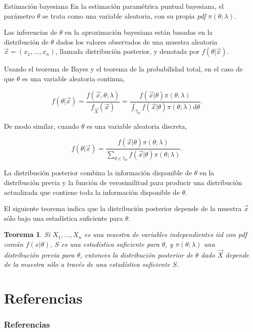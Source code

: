 \documentclass{beamer}
\newtheorem{theo}{Teorema}[section]
\begin{document}
	\begin{frame}[allowframebreaks]{Estimación bayesiana}
		En la estimación paramétrica puntual bayesiana, el parámetro $\theta$ se trata como una variable aleatoria, con su propia \textit{pdf} $\pi(\theta;\lambda)$.
		
		Las inferencias de $\theta$ en la aproximación bayesiana están basadas en la distribución de $\theta$ dados los valores observados de una muestra aleatoria $\vec{x}=(x_1,\dots,x_n)$, llamada distribución posterior, y denotada por $f(\theta | \vec{x})$.
		
		Usando el teorema de Bayes y el teorema de la probabilidad total, en el caso de que $\theta$ es una variable aleatoria continua,
		
		$$f(\theta | \vec{x})=\frac{f(\vec{x},\theta;\lambda)}{f_{\vec{X}}(\vec{x})}=\frac{f(\vec{x}|\theta)\pi(\theta;\lambda)}{\int_{\mathbb{S}_\theta}f(\vec{x}|\theta)\pi(\theta;\lambda)\mathrm{d}\theta}.$$
		
		De modo similar, cuando $\theta$ es una variable aleatoria discreta,
		
		$$f(\theta|\vec{x})=\frac{f(\vec{x}|\theta)\pi(\theta;\lambda)}{\sum_{\theta\in\mathbb{S}_\theta}f(\vec{x}|\theta)\pi(\theta;\lambda)}.$$
		
		La distribución posterior combina la información disponible de $\theta$ en la distribución previa y la función de verosimilitud para producir una distribución actualizada que contiene toda la información disponible de $\theta$.
		
El siguiente teorema indica que la distribución posterior depende de la muestra $\vec{x}$ sólo bajo una estadística suficiente para $\theta$.
		
		\begin{theo}
			Si $X_1,\dots,X_n$ es una muestra de variables independientes iid con pdf común $f(x|\theta)$, $S$ es una estadística suficiente para $\theta$, y $\pi(\theta;\lambda)$ una distribución previa para $\theta$, entonces la distribución posterior de $\theta$ dado $\vec{X}$ depende de la muestra sólo a través de una estadística suficiente $S$.
		\end{theo}
	\end{frame}
	\section{Referencias}
	\begin{frame}
	\frametitle{Referencias}

	\nocite{*}
	
	

	\end{frame}
	
\end{document}
